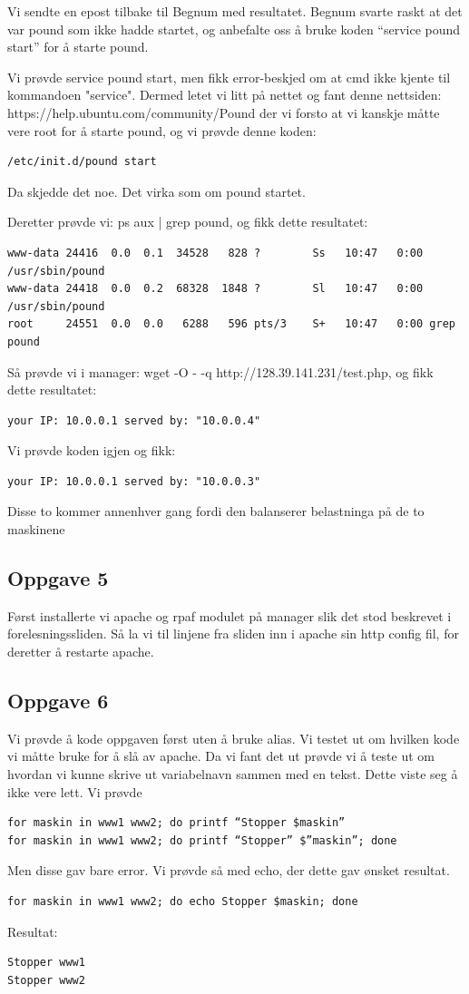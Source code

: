 \documentclass[a4paper, norsk, 12pt]{article}
\begin{document}
Vi sendte en epost tilbake til Begnum med resultatet. Begnum svarte raskt at det var pound som ikke hadde startet, og anbefalte oss å bruke koden “service pound start” for å starte pound.

Vi prøvde service pound start, men fikk error-beskjed om at cmd ikke kjente til kommandoen "service". Dermed letet vi litt på nettet og fant denne nettsiden:   https://help.ubuntu.com/community/Pound
der vi forsto at vi kanskje måtte vere root for å starte pound, og vi prøvde denne koden:
\begin{verbatim}
/etc/init.d/pound start
\end{verbatim}
Da skjedde det noe. Det virka som om pound startet.

Deretter prøvde vi: ps aux | grep pound, og fikk dette resultatet:
\begin{verbatim}
www-data 24416  0.0  0.1  34528   828 ?        Ss   10:47   0:00 /usr/sbin/pound
www-data 24418  0.0  0.2  68328  1848 ?        Sl   10:47   0:00 /usr/sbin/pound
root     24551  0.0  0.0   6288   596 pts/3    S+   10:47   0:00 grep pound
\end{verbatim}
Så prøvde vi i manager: wget -O - -q http://128.39.141.231/test.php, og fikk dette resultatet:
\begin{verbatim}
your IP: 10.0.0.1 served by: "10.0.0.4"
\end{verbatim}
Vi prøvde koden igjen og fikk: 
\begin{verbatim}
your IP: 10.0.0.1 served by: "10.0.0.3"
\end{verbatim} 
Disse to kommer annenhver gang fordi den balanserer belastninga på de to maskinene

\subsection{Oppgave 5}
Først installerte vi apache og rpaf modulet på manager slik det stod beskrevet i forelesningssliden. Så la vi til linjene fra sliden inn i apache sin http config fil, for deretter å restarte apache.

\subsection{Oppgave 6}
Vi prøvde å kode oppgaven først uten å bruke alias. Vi testet ut om hvilken kode vi måtte bruke for å slå av apache. Da vi fant det ut prøvde vi å teste ut om hvordan vi kunne skrive ut variabelnavn sammen med en tekst. Dette viste seg å ikke vere lett. Vi prøvde
\begin{verbatim}
for maskin in www1 www2; do printf “Stopper $maskin”
for maskin in www1 www2; do printf “Stopper” $”maskin”; done
\end{verbatim}
Men disse gav bare error. Vi prøvde så med echo, der dette gav ønsket resultat.
\begin{verbatim}
for maskin in www1 www2; do echo Stopper $maskin; done
\end{verbatim}
  Resultat:     
\begin{verbatim}
Stopper www1
Stopper www2
\end{verbatim}
\end{document}
